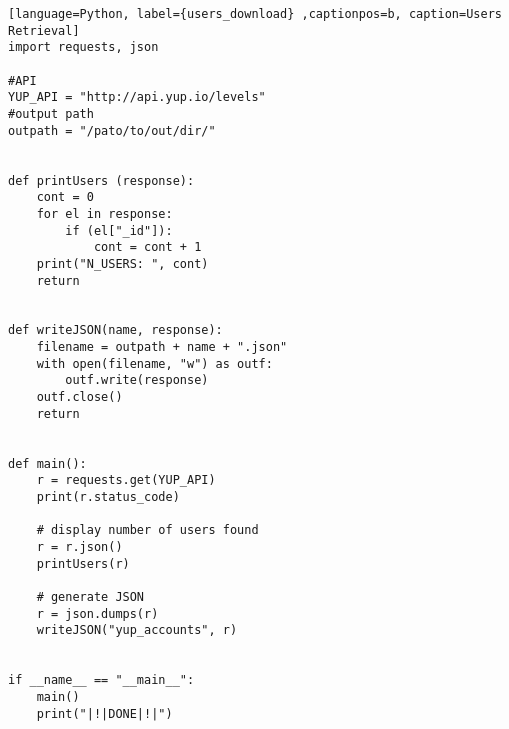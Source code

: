 \begin{lstlisting}[language=Python, label={users_download} ,captionpos=b, caption=Users Retrieval]
import requests, json

#API
YUP_API = "http://api.yup.io/levels"
#output path
outpath = "/pato/to/out/dir/"


def printUsers (response):
    cont = 0
    for el in response:
        if (el["_id"]): 
            cont = cont + 1
    print("N_USERS: ", cont)
    return


def writeJSON(name, response):
    filename = outpath + name + ".json"
    with open(filename, "w") as outf:
        outf.write(response)
    outf.close()
    return


def main():
    r = requests.get(YUP_API)
    print(r.status_code)

    # display number of users found
    r = r.json()
    printUsers(r)

    # generate JSON
    r = json.dumps(r)
    writeJSON("yup_accounts", r)


if __name__ == "__main__":
    main()
    print("|!|DONE|!|")
\end{lstlisting}
